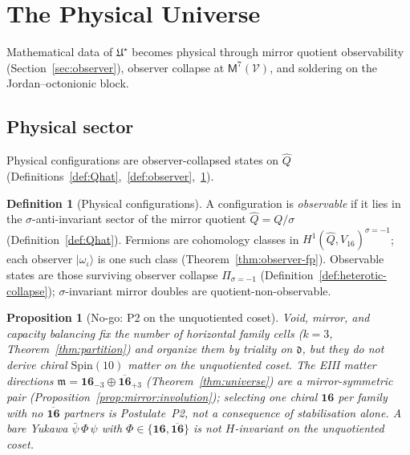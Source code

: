 \documentclass[11pt]{article}
\theoremstyle{plain}
\newtheorem{proposition}[theorem]{Proposition}
\theoremstyle{definition}
\newtheorem{definition}[theorem]{Definition}
\theoremstyle{remark}
\numberwithin{equation}{section}
\newcommand{\Spin}{\mathrm{Spin}}
\newcommand{\Void}{\mathcal{V}}
\newcommand{\Mirror}{\mathsf{M}}
\newcommand{\orderparam}{\Phi}
\begin{document}
\section{The Physical Universe}
\label{sec:physics}

Mathematical data of $\mathfrak{U}^\star$ becomes physical through mirror
quotient observability (Section~\ref{sec:observer}), observer collapse at
$\Mirror^7(\Void)$, and soldering on the Jordan--octonionic block.

\subsection{Physical sector}
\label{sec:physics:sector}

Physical configurations are observer-collapsed states on $\hat Q$
(Definitions~\ref{def:Qhat},~\ref{def:observer},~\ref{def:physical}).

\begin{definition}[Physical configurations]\label{def:physical}
A configuration is \emph{observable} if it lies in the $\sigma$-anti-invariant
sector of the mirror quotient $\hat Q=Q/\sigma$
(Definition~\ref{def:Qhat}). Fermions are cohomology classes in
$H^1(\hat Q,V_{16})^{\sigma=-1}$; each observer $|\omega_\iota\rangle$ is one
such class (Theorem~\ref{thm:observer-fp}). Observable states are those
surviving observer collapse $\Pi_{\sigma=-1}$
(Definition~\ref{def:heterotic-collapse}); $\sigma$-invariant mirror doubles
are quotient-non-observable.
\end{definition}

\begin{proposition}[No-go: P2 on the unquotiented coset]\label{prop:p2-nogo}
Void, mirror, and capacity balancing fix the \emph{number} of horizontal
family cells ($k=3$, Theorem~\ref{thm:partition}) and organize them by triality
on $\mathfrak{d}$, but they do \emph{not} derive chiral $\Spin(10)$ matter on
the unquotiented coset. The EIII matter directions
$\mathfrak{m}=\mathbf{16}_{-3}\oplus\overline{\mathbf{16}}_{+3}$
(Theorem~\ref{thm:universe}) are a mirror-symmetric pair
(Proposition~\ref{prop:mirror:involution}); selecting one chiral
$\mathbf{16}$ per family with no $\overline{\mathbf{16}}$ partners is
\emph{Postulate~P2}, not a consequence of stabilisation alone. A bare Yukawa
$\bar\psi\,\orderparam\,\psi$ with
$\orderparam\in\{\mathbf{16},\overline{\mathbf{16}}\}$ is not $H$-invariant on
the unquotiented coset.
\end{proposition}
\end{document}
